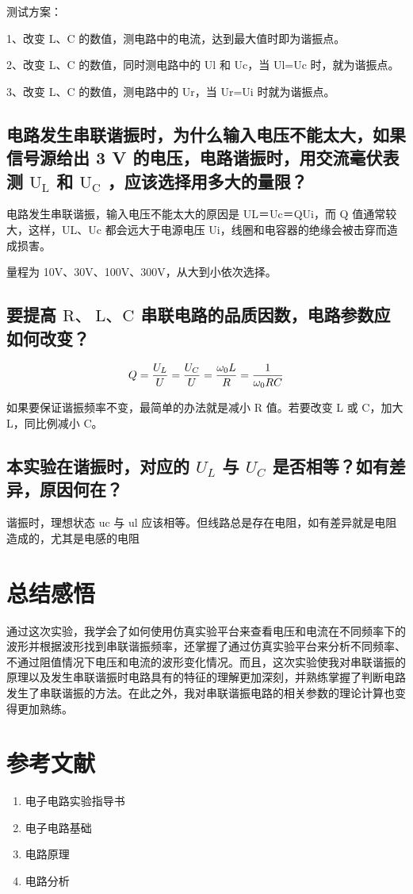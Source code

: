 \documentclass{article}
\begin{document}
测试方案：

1、改变 L、C 的数值，测电路中的电流，达到最大值时即为谐振点。

2、改变 L、C 的数值，同时测电路中的 Ul 和 Uc，当 Ul=Uc 时，就为谐振点。

3、改变 L、C 的数值，测电路中的 Ur，当 Ur=Ui 时就为谐振点。



\subsection{电路发生串联谐振时，为什么输入电压不能太大，如果信号源给出 3 V 的电压，电路谐振时，用交流毫伏表测 $\mathrm{U}_{\mathrm{L}}$ 和 $\mathrm{U}_{\mathrm{C}}$ ，应该选择用多大的量限？}

电路发生串联谐振，输入电压不能太大的原因是 UL＝Uc＝QUi，而 Q 值通常较大，这样，UL、Uc 都会远大于电源电压 Ui，线圈和电容器的绝缘会被击穿而造成损害。

量程为 10V、30V、100V、300V，从大到小依次选择。
\subsection{要提高 $\mathrm{R} 、 \mathrm{~L} 、 \mathrm{C}$ 串联电路的品质因数，电路参数应如何改变？}
$$
Q=\frac{U_L}{U}=\frac{U_C}{U}=\frac{\omega_0 L}{R}=\frac{1}{\omega_0 R C} \\
$$

如果要保证谐振频率不变，最简单的办法就是减小 R 值。若要改变 L 或 C，加大 L，同比例减小 C。

\subsection{本实验在谐振时，对应的 $U_L$ 与 $U_C$ 是否相等？如有差异，原因何在？}
谐振时，理想状态 uc 与 ul 应该相等。但线路总是存在电阻，如有差异就是电阻造成的，尤其是电感的电阻
\section{总结感悟 }
通过这次实验，我学会了如何使用仿真实验平台来查看电压和电流在不同频率下的波形并根据波形找到串联谐振频率，还掌握了通过仿真实验平台来分析不同频率、不通过阻值情况下电压和电流的波形变化情况。而且，这次实验使我对串联谐振的原理以及发生串联谐振时电路具有的特征的理解更加深刻，并熟练掌握了判断电路发生了串联谐振的方法。在此之外，我对串联谐振电路的相关参数的理论计算也变得更加熟练。

\section{参考文献}
\begin{enumerate}
    \item 电子电路实验指导书
    \item 电子电路基础
    \item 电路原理
    \item 电路分析
\end{enumerate} 
\end{document}
